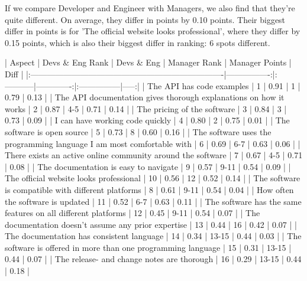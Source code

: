 \documentclass[11pt]{article}
\begin{document}
\begin{multicols}{2}

    If we compare Developer and Engineer with Managers, we also find that
    they're quite different. On average, they differ in points by 0.10
    points. Their biggest differ in points is for 'The official website
    looks professional', where they differ by 0.15 points, which is also
    their biggest differ in ranking: 6 spots different.

    |                                Aspect                                 | Devs & Eng Rank | Devs & Eng | Manager Rank | Manager Points | Diff |
    |:----------------------------------------------------------------------|----------------:|:-----------|-------------:|:---------------|-----:|
    | The API has code examples                                             |               1 | 0.91       |            1 | 0.79           | 0.13 |
    | The API documentation gives thorough explanations on how it works     |               2 | 0.87       |          4-5 | 0.71           | 0.14 |
    | The pricing of the software                                           |               3 | 0.84       |            3 | 0.73           | 0.09 |
    | I can have working code quickly                                       |               4 | 0.80       |            2 | 0.75           | 0.01 |
    | The software is open source                                           |               5 | 0.73       |            8 | 0.60           | 0.16 |
    | The software uses the programming language I am most comfortable with |               6 | 0.69       |          6-7 | 0.63           | 0.06 |
    | There exists an active online community around the software           |               7 | 0.67       |          4-5 | 0.71           | 0.08 |
    | The documentation is easy to navigate                                 |               9 | 0.57       |         9-11 | 0.54           | 0.09 |
    | The official website looks professional                               |              10 | 0.56       |           12 | 0.52           | 0.14 |
    | The software is compatible with different platforms                   |               8 | 0.61       |         9-11 | 0.54           | 0.04 |
    | How often the software is updated                                     |              11 | 0.52       |          6-7 | 0.63           | 0.11 |
    | The software has the same features on all different platforms         |              12 | 0.45       |         9-11 | 0.54           | 0.07 |
    | The documentation doesn't assume any prior expertise                  |              13 | 0.44       |           16 | 0.42           | 0.07 |
    | The documentation has consistent language                             |              14 | 0.34       |        13-15 | 0.44           | 0.03 |
    | The software is offered in more than one programming language         |              15 | 0.31       |        13-15 | 0.44           | 0.07 |
    | The release- and change notes are thorough                            |              16 | 0.29       |        13-15 | 0.44           | 0.18 |



\end{multicols}
\end{document}
